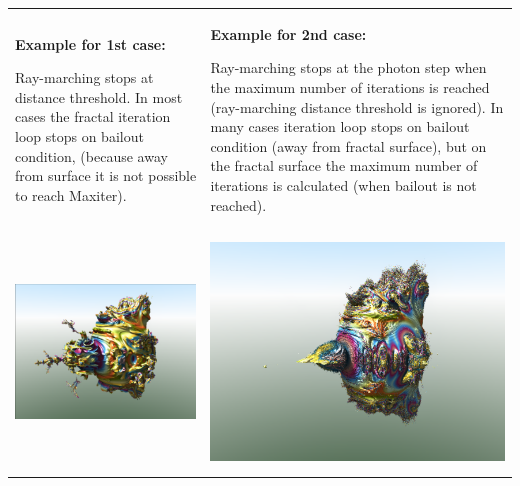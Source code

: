 \begin{longtable}[]{@{}ll@{}}
\toprule
\textbf{Example for 1st case:}

Ray-marching stops at distance threshold. In most cases the fractal
iteration loop stops on bailout condition, (because away from surface it
is not possible to reach Maxiter). & \textbf{Example for 2nd case:}

Ray-marching stops at the photon step when the maximum number of
iterations is reached (ray-marching distance threshold is ignored). In
many cases iteration loop stops on bailout condition (away from fractal
surface), but on the fractal surface the maximum number of iterations is
calculated (when bailout is not reached).\tabularnewline
\includegraphics[width=3.22795in,height=2.40000in]{img/manual/media/image7.png}
&
\includegraphics[width=3.26890in,height=2.44016in]{img/manual/media/image8.png}\tabularnewline
\bottomrule
\end{longtable}

